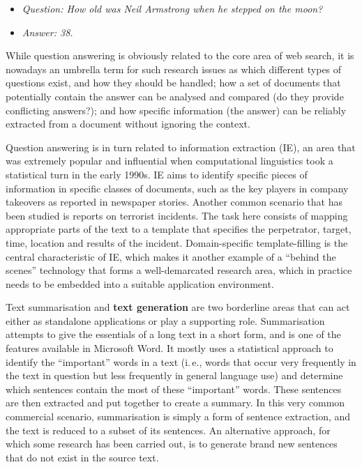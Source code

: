 \begin{multicols}{2}
\begin{itemize}
\item[] \textit{Question: How old was Neil Armstrong when he stepped on the moon?}
\item[] \textit{Answer: 38.}
\end{itemize}

While question answering is obviously related to the core area of web search, it is nowadays an umbrella term for such research issues as which different types of questions exist, and how they should be handled; how a set of documents that potentially contain the answer can be analysed and compared (do they provide conflicting answers?); and how specific information (the answer) can be reliably extracted from a document without ignoring the context. 


Question answering is in turn related to information extraction (IE), an area that was extremely popular and influential when computational linguistics took a statistical turn in the early 1990s. IE aims to identify specific pieces of information in specific classes of documents, such as the key players in company takeovers as reported in newspaper stories. Another common scenario that has been studied is reports on terrorist incidents. The task here consists of mapping appropriate parts of the text to a template that specifies the perpetrator, target, time, location and results of the incident. Domain-specific template-filling is the central characteristic of IE, which makes it another example of a “behind the scenes” technology that forms a well-demarcated research area, which in practice needs to be embedded into a suitable application environment. 

    Text summarisation and \textbf{text generation} are two borderline areas that can act either as standalone applications or play a supporting role. Summarisation attempts to give the essentials of a long text in a short form, and is one of the features available in Microsoft Word. It mostly uses a statistical approach to identify the “important” words in a text (i.\,e., words that occur very frequently in the text in question but less frequently in general language use) and determine which sentences contain the most of these “important” words. These sentences are then extracted and put together to create a summary. In this very common commercial scenario, summarisation is simply a form of sentence extraction, and the text is reduced to a subset of its sentences. An alternative approach, for which some research has been carried out, is to generate brand new sentences that do not exist in the source text. 


\end{multicols}
